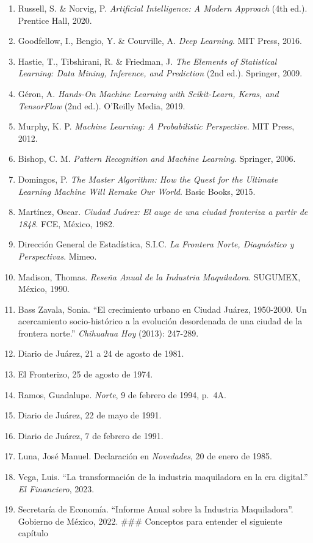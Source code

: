 \documentclass[
  10pt,
  letterpaper,
]{book}
\begin{document}
\begin{enumerate}
\def\labelenumi{\arabic{enumi}.}
\item
  Russell, S. \& Norvig, P. \emph{Artificial Intelligence: A Modern
  Approach} (4th ed.). Prentice Hall, 2020.
\item
  Goodfellow, I., Bengio, Y. \& Courville, A. \emph{Deep Learning}. MIT
  Press, 2016.
\item
  Hastie, T., Tibshirani, R. \& Friedman, J. \emph{The Elements of
  Statistical Learning: Data Mining, Inference, and Prediction} (2nd
  ed.). Springer, 2009.
\item
  Géron, A. \emph{Hands-On Machine Learning with Scikit-Learn, Keras,
  and TensorFlow} (2nd ed.). O'Reilly Media, 2019.
\item
  Murphy, K. P. \emph{Machine Learning: A Probabilistic Perspective}.
  MIT Press, 2012.
\item
  Bishop, C. M. \emph{Pattern Recognition and Machine Learning}.
  Springer, 2006.
\item
  Domingos, P. \emph{The Master Algorithm: How the Quest for the
  Ultimate Learning Machine Will Remake Our World}. Basic Books, 2015.
\item
  Martínez, Oscar. \emph{Ciudad Juárez: El auge de una ciudad fronteriza
  a partir de 1848}. FCE, México, 1982.
\item
  Dirección General de Estadística, S.I.C. \emph{La Frontera Norte,
  Diagnóstico y Perspectivas}. Mimeo.
\item
  Madison, Thomas. \emph{Reseña Anual de la Industria Maquiladora}.
  SUGUMEX, México, 1990.
\item
  Bass Zavala, Sonia. ``El crecimiento urbano en Ciudad Juárez,
  1950-2000. Un acercamiento socio-histórico a la evolución desordenada
  de una ciudad de la frontera norte.'' \emph{Chihuahua Hoy} (2013):
  247-289.
\item
  Diario de Juárez, 21 a 24 de agosto de 1981.
\item
  El Fronterizo, 25 de agosto de 1974.
\item
  Ramos, Guadalupe. \emph{Norte}, 9 de febrero de 1994, p.~4A.
\item
  Diario de Juárez, 22 de mayo de 1991.
\item
  Diario de Juárez, 7 de febrero de 1991.
\item
  Luna, José Manuel. Declaración en \emph{Novedades}, 20 de enero de
  1985.
\item
  Vega, Luis. ``La transformación de la industria maquiladora en la era
  digital.'' \emph{El Financiero}, 2023.
\item
  Secretaría de Economía. ``Informe Anual sobre la Industria
  Maquiladora''. Gobierno de México, 2022. \#\#\# Conceptos para
  entender el siguiente capítulo
\end{enumerate}
\end{document}
